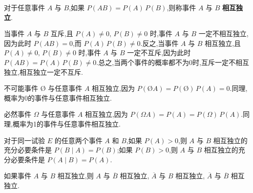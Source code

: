 \begin{definition}
    \indent 对于任意事件 $A$ 与 $B$,如果 $P(AB) = P(A) \, P(B)$,则称事件 $A$ 与 $B$ \textbf{相互独立}.
\end{definition}

\begin{note}
    \indent 当事件 $A$ 与 $B$ 互斥,且 $P(A) \not= 0, \, P(B) \not= 0$ 时,事件 $A$ 与 $B$ 一定不相互独立,因为此时 $P(AB) = 0$,而 $P(A) \, P(B) \not= 0$.反之,当事件 $A$ 与 $B$ 相互独立,且 $P(A) \not= 0, \, P(B) \not= 0$ 时,事件 $A$ 与 $B$ 一定不互斥,因为此时 $P(AB) = P(A) \, P(B) \not= 0$.总之,当两个事件的概率都不为0时,互斥一定不相互独立,相互独立一定不互斥.

    不可能事件 $\text{\O}$ 与任意事件 $A$ 相互独立,因为 $P(\text{\O} A) = P(\text{\O}) \, P(A) = 0$.同理,概率为0的事件与任意事件相互独立.

    必然事件 $\varOmega$ 与任意事件 $A$ 相互独立,因为 $P(\varOmega A) = P(A) = P(\varOmega) \, P(A)$.同理,概率为1的事件与任意事件相互独立.
\end{note}

\begin{conclusion}
    \indent 对于同一试验 $E$ 的任意两个事件 $A$ 和 $B$,如果 $P(A) > 0$,则 $A$ 与 $B$ 相互独立的充分必要条件是 $P(B \mid A) = P(B)$;如果 $P(B) > 0$,则 $A$ 与 $B$ 相互独立的充分必要条件是 $P(A \mid B) = P(A)$.
\end{conclusion}

\begin{conclusion}
    \indent 如果事件 $A$ 与 $B$ 相互独立,则 $A$ 与 $\overline{B}$ 相互独立, $\overline{A}$ 与 $B$ 相互独立, $\overline{A}$ 与 $\overline{B}$ 相互独立.
\end{conclusion}

